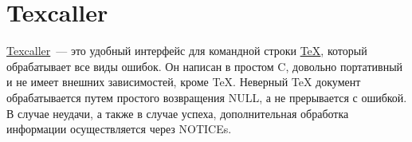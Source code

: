 \section{Texcaller}

\href{http://www.profv.de/texcaller/}{Texcaller}~--- это удобный интерфейс для командной строки \href{https://ru.wikipedia.org/wiki/TeX}{TeX}, который обрабатывает все виды ошибок. Он написан в простом C, довольно портативный и не имеет внешних зависимостей, кроме TeX. Неверный TeX документ обрабатывается путем простого возвращения NULL, а не прерывается с ошибкой. В случае неудачи, а также в случае успеха, дополнительная обработка информации осуществляется через NOTICEs.
